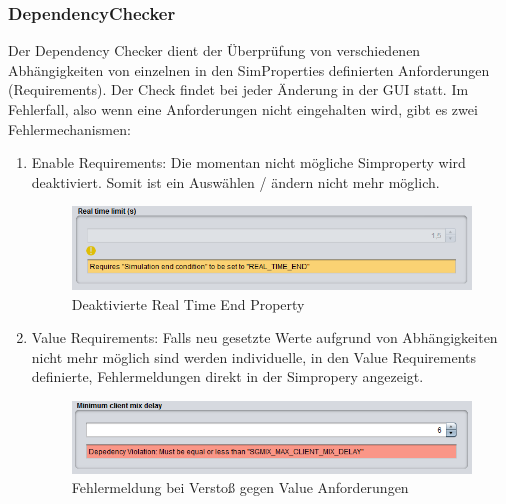 \documentclass[a4paper, 11pt]{article} %
\begin{document}
\subsubsection{DependencyChecker}
\label{sssub:dependencychecker}
Der Dependency Checker dient der Überprüfung von verschiedenen Abhängigkeiten von einzelnen in den SimProperties definierten Anforderungen (Requirements).
Der Check findet bei jeder Änderung in der GUI statt. Im Fehlerfall, also wenn eine Anforderungen nicht eingehalten wird, gibt es zwei Fehlermechanismen:
\begin{enumerate}
	\item Enable Requirements: Die momentan nicht mögliche Simproperty wird deaktiviert. Somit ist ein Auswählen / ändern nicht mehr möglich.

\begin{figure}[!htp]
\includegraphics[width=\textwidth,scale=0.5]{img/DependencyChecker_RealTimeDisabled}
\caption{Deaktivierte Real Time End Property}
\label{fig:deactivatedRealTimeEnd}
\end{figure}

	\item Value Requirements: Falls neu gesetzte Werte aufgrund von Abhängigkeiten nicht mehr möglich sind werden individuelle, in den Value Requirements definierte, Fehlermeldungen direkt in der Simpropery angezeigt.
	
	\begin{figure}[!htp]
\includegraphics[width=\textwidth,scale=0.5]{img/DependencyChecker_MiniumClientMixDelayError}
\caption{Fehlermeldung bei Verstoß gegen Value Anforderungen}
\label{fig:errorMessageValueRequirement}
\end{figure}
\end{enumerate}

\end{document}
